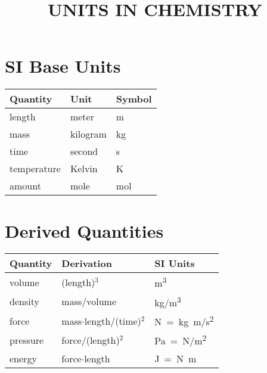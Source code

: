 \documentclass[10pt]{article}
\begin{document}
    \title{\uppercase{Units in Chemistry}}
    \date{\vspace{-10ex}}

    \maketitle
    \thispagestyle{empty}

%
    \begin{minipage}[t]{0.5\textwidth}
        \section*{SI Base Units}
        \begin{tabular}{l l l}
            Quantity    & Unit      & Symbol \\
            \hline
            length      & meter     & \si{m} \\
            mass        & kilogram  & \si{kg} \\
            time        & second    & \si{s} \\
            temperature & Kelvin    & \si{K} \\
            amount      & mole      & \si{mol} \\
        \end{tabular}
        \sectionspace
        \section*{Derived Quantities}
        \begin{tabular}{l l l}
            Quantity    & Derivation               & SI Units \\
            \hline
            volume      & (length)$^3$             & \si{m^3} \\
            density     & mass/volume              & \si{kg/m^3} \\
            force       & mass$\cdot$length/(time)$^2$ & \si{N = kg.m/s^2} \\
            pressure    & force/(length)$^2$       & \si{Pa = N/m^2} \\
            energy      & force$\cdot$length           & \si{J = N.m} \\
        \end{tabular}
    \end{minipage}%
\end{document}
